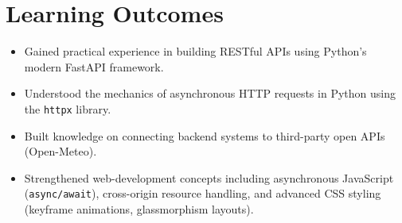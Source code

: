 \documentclass[12pt,a4paper]{article}
\begin{document}
\section*{Learning Outcomes}
\begin{itemize}
    \item Gained practical experience in building RESTful APIs using Python's modern FastAPI framework.
    \item Understood the mechanics of asynchronous HTTP requests in Python using the \texttt{httpx} library.
    \item Built knowledge on connecting backend systems to third-party open APIs (Open-Meteo).
    \item Strengthened web-development concepts including asynchronous JavaScript (\texttt{async/await}), cross-origin resource handling, and advanced CSS styling (keyframe animations, glassmorphism layouts).
\end{itemize}
\end{document}
